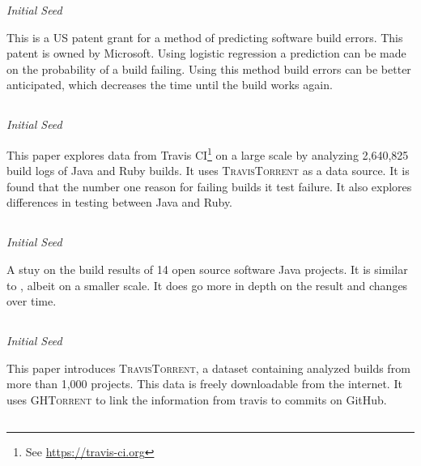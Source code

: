 \documentclass[]{book}
\let\rmarkdownfootnote\footnote%
\def\footnote{\protect\rmarkdownfootnote}
\begin{document}
\emph{Initial Seed}

This is a US patent grant for a method of predicting software build
errors. This patent is owned by Microsoft. Using logistic regression a
prediction can be made on the probability of a build failing. Using this
method build errors can be better anticipated, which decreases the time
until the build works again.

\subsection{\texorpdfstring{\citet{beller2017oops}}{@beller2017oops}}\label{beller2017oops}

\emph{Initial Seed}

This paper explores data from Travis CI\footnote{See
  \url{https://travis-ci.org}} on a large scale by analyzing 2,640,825
build logs of Java and Ruby builds. It uses \textsc{TravisTorrent} as a
data source. It is found that the number one reason for failing builds
it test failure. It also explores differences in testing between Java
and Ruby.

\subsection{\texorpdfstring{\citet{rausch2017empirical}}{@rausch2017empirical}}\label{rausch2017empirical}

\emph{Initial Seed}

A stuy on the build results of 14 open source software Java projects. It
is similar to \citet{beller2017oops}, albeit on a smaller scale. It does
go more in depth on the result and changes over time.

\subsection{\texorpdfstring{\citet{beller2017travistorrent}}{@beller2017travistorrent}}\label{beller2017travistorrent}

\emph{Initial Seed}

This paper introduces \textsc{TravisTorrent}, a dataset containing
analyzed builds from more than 1,000 projects. This data is freely
downloadable from the internet. It uses \textsc{GHTorrent} to link the
information from travis to commits on GitHub.

\subsection{\texorpdfstring{\citet{pinto2018work}}{@pinto2018work}}\label{pinto2018work}
\end{document}
